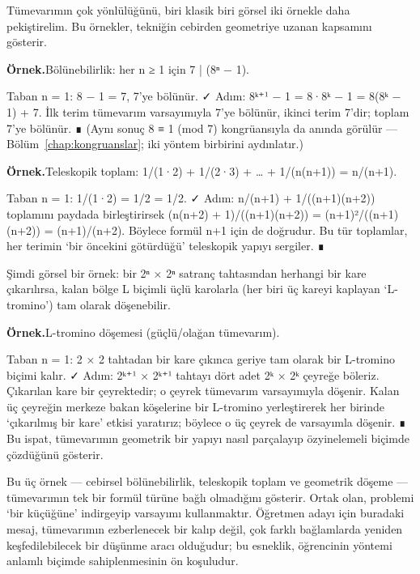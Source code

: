 Tümevarımın çok yönlülüğünü, biri klasik biri görsel iki örnekle daha pekiştirelim. Bu örnekler, tekniğin cebirden geometriye uzanan kapsamını gösterir.

\begin{tcolorbox}[bookbox,colback=cEx]\textbf{\textsf{\textcolor{cAcc}{Örnek.}}}\quad Bölünebilirlik: her n ≥ 1 için 7 | (8ⁿ − 1).\par\medskip{}Taban n = 1: 8 − 1 = 7, 7’ye bölünür. ✓  Adım: 8ᵏ⁺¹ − 1 = 8·8ᵏ − 1 = 8(8ᵏ − 1) + 7. İlk terim tümevarım varsayımıyla 7’ye bölünür, ikinci terim 7’dir; toplam 7’ye bölünür. ∎  (Aynı sonuç 8 ≡ 1 (mod 7) kongrüansıyla da anında görülür — Bölüm~\ref{chap:kongruanslar}; iki yöntem birbirini aydınlatır.)\end{tcolorbox}

\begin{tcolorbox}[bookbox,colback=cEx]\textbf{\textsf{\textcolor{cAcc}{Örnek.}}}\quad Teleskopik toplam: 1/(1·2) + 1/(2·3) + … + 1/(n(n+1)) = n/(n+1).\par\medskip{}Taban n = 1: 1/(1·2) = 1/2 = 1/2. ✓  Adım: n/(n+1) + 1/((n+1)(n+2)) toplamını paydada birleştirirsek (n(n+2) + 1)/((n+1)(n+2)) = (n+1)²/((n+1)(n+2)) = (n+1)/(n+2). Böylece formül n+1 için de doğrudur. Bu tür toplamlar, her terimin ‘bir öncekini götürdüğü’ teleskopik yapıyı sergiler. ∎\end{tcolorbox}

Şimdi görsel bir örnek: bir 2ⁿ × 2ⁿ satranç tahtasından herhangi bir kare çıkarılırsa, kalan bölge L biçimli üçlü karolarla (her biri üç kareyi kaplayan ‘L-tromino’) tam olarak döşenebilir.

\begin{tcolorbox}[bookbox,colback=cEx]\textbf{\textsf{\textcolor{cAcc}{Örnek.}}}\quad L-tromino döşemesi (güçlü/olağan tümevarım).\par\medskip{}Taban n = 1: 2 × 2 tahtadan bir kare çıkınca geriye tam olarak bir L-tromino biçimi kalır. ✓  Adım: 2ᵏ⁺¹ × 2ᵏ⁺¹ tahtayı dört adet 2ᵏ × 2ᵏ çeyreğe böleriz. Çıkarılan kare bir çeyrektedir; o çeyrek tümevarım varsayımıyla döşenir. Kalan üç çeyreğin merkeze bakan köşelerine bir L-tromino yerleştirerek her birinde ‘çıkarılmış bir kare’ etkisi yaratırız; böylece o üç çeyrek de varsayımla döşenir. ∎  Bu ispat, tümevarımın geometrik bir yapıyı nasıl parçalayıp özyinelemeli biçimde çözdüğünü gösterir.\end{tcolorbox}

Bu üç örnek — cebirsel bölünebilirlik, teleskopik toplam ve geometrik döşeme — tümevarımın tek bir formül türüne bağlı olmadığını gösterir. Ortak olan, problemi ‘bir küçüğüne’ indirgeyip varsayımı kullanmaktır. Öğretmen adayı için buradaki mesaj, tümevarımın ezberlenecek bir kalıp değil, çok farklı bağlamlarda yeniden keşfedilebilecek bir düşünme aracı olduğudur; bu esneklik, öğrencinin yöntemi anlamlı biçimde sahiplenmesinin ön koşuludur.

